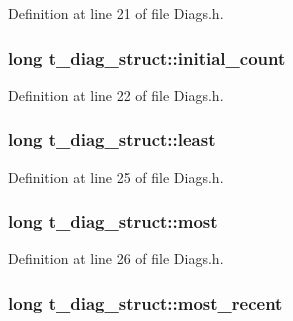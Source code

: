 Definition at line 21 of file Diags.\+h.

\subsubsection[{\texorpdfstring{initial\+\_\+count}{initial_count}}]{\setlength{\rightskip}{0pt plus 5cm}long t\+\_\+diag\+\_\+struct\+::initial\+\_\+count}\hypertarget{structt__diag__struct_a5464ee332d79d5bc6409b817ea73c260}{}\label{structt__diag__struct_a5464ee332d79d5bc6409b817ea73c260}


Definition at line 22 of file Diags.\+h.

\subsubsection[{\texorpdfstring{least}{least}}]{\setlength{\rightskip}{0pt plus 5cm}long t\+\_\+diag\+\_\+struct\+::least}\hypertarget{structt__diag__struct_a0ba6e05b3a388401bfc4efd33260a977}{}\label{structt__diag__struct_a0ba6e05b3a388401bfc4efd33260a977}


Definition at line 25 of file Diags.\+h.

\subsubsection[{\texorpdfstring{most}{most}}]{\setlength{\rightskip}{0pt plus 5cm}long t\+\_\+diag\+\_\+struct\+::most}\hypertarget{structt__diag__struct_a9f3236da1b87b126687573ce17b39a3d}{}\label{structt__diag__struct_a9f3236da1b87b126687573ce17b39a3d}


Definition at line 26 of file Diags.\+h.

\subsubsection[{\texorpdfstring{most\+\_\+recent}{most_recent}}]{\setlength{\rightskip}{0pt plus 5cm}long t\+\_\+diag\+\_\+struct\+::most\+\_\+recent}\hypertarget{structt__diag__struct_a1d14246bf193d4f771d099626c3384ae}{}\label{structt__diag__struct_a1d14246bf193d4f771d099626c3384ae}


